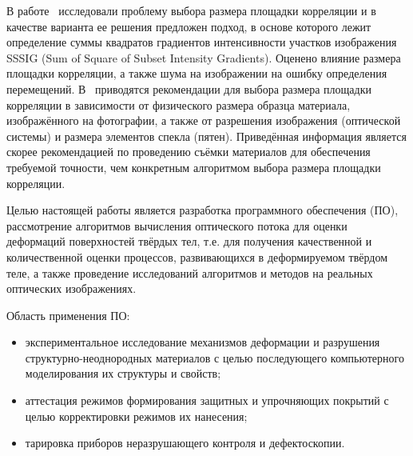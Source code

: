 В работе~\cite{pan_intro_four} исследовали проблему выбора размера площадки корреляции и в качестве варианта ее решения предложен подход, в основе которого лежит определение суммы квадратов градиентов интенсивности участков изображения {SSSIG} (Sum of Square of Subset Intensity Gradients). Оценено влияние размера площадки корреляции, а также шума на изображении на ошибку определения перемещений. В~\cite{pan_intro_one} приводятся рекомендации для выбора размера площадки корреляции в зависимости от физического размера образца материала, изображённого на фотографии, а также от разрешения изображения (оптической системы) и размера элементов спекла (пятен). Приведённая информация является скорее рекомендацией по проведению съёмки материалов для обеспечения требуемой точности, чем конкретным алгоритмом выбора размера площадки корреляции.

Целью настоящей работы является разработка программного обеспечения (ПО), рассмотрение алгоритмов вычисления оптического потока для оценки деформаций поверхностей твёрдых тел, т.е. для получения качественной и количественной оценки процессов, развивающихся в деформируемом твёрдом теле, а также проведение исследований алгоритмов и методов на реальных оптических изображениях.

Область применения ПО:
\begin{itemize}
\item экспериментальное исследование механизмов деформации и разрушения структурно-неоднородных материалов с целью последующего компьютерного моделирования их структуры и свойств;
\item аттестация режимов формирования защитных и упрочняющих покрытий с целью корректировки режимов их нанесения;
\item тарировка приборов неразрушающего контроля и дефектоскопии.
\end{itemize}

